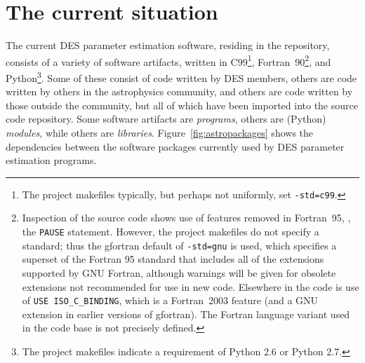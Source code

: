 \documentclass[draftmode,draftwater]{memarticle}
\newcommand{\despipe}{\name{des-pipe}\xspace}
\begin{document}

\chapter{The current situation\label{ch:current_situation}}

The current DES parameter estimation software, residing in the
\despipe repository, consists of a variety of software
artifacts, written in C99\footnote{The project makefiles typically, but
  perhaps not uniformly, set \texttt{-std=c99}.},
Fortran~90\footnote{Inspection of the source code shows use of features
  removed in Fortran~95, \eg, the \texttt{PAUSE} statement. However, the
  project makefiles do not specify a standard; thus the gfortran default
  of \texttt{-std=gnu} is used, which specifies a superset of the
  Fortran 95 standard that includes all of the extensions supported by
  GNU Fortran, although warnings will be given for obsolete extensions
  not recommended for use in new code. Elsewhere in the code is use of
  \texttt{USE ISO\_C\_BINDING}, which is a Fortran~2003 feature (and a
  GNU extension in earlier versions of gfortran). The Fortran language
  variant used in the code base is not precisely defined.}, and
Python\footnote{The project makefiles indicate a requirement of Python
  2.6 or Python 2.7.}. Some of these consist of code written by DES
members, others are code written by others in the astrophysics
community, and others are code written by those outside the community,
but all of which have been imported into the \despipe source
code repository. Some software artifacts are \emph{programs}, others are
(Python) \emph{modules}, while others are \emph{libraries}.
Figure~\ref{fig:astropackages} shows the dependencies between the
software packages currently used by DES parameter estimation programs.
\end{document}
